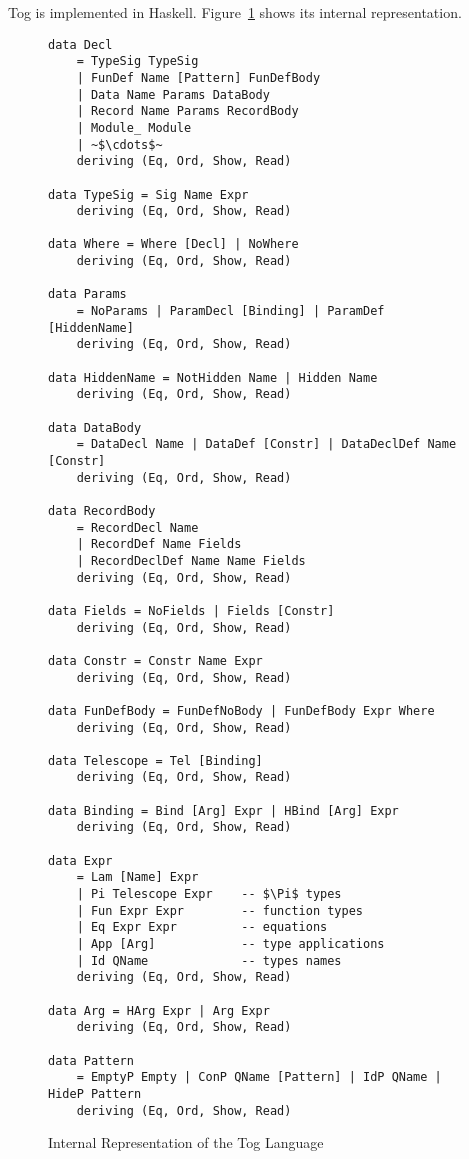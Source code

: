 Tog is implemented in Haskell. Figure~\ref{fig:togRepr} shows its internal representation. 
\begin{figure}
\begin{verbatim}
data Decl
    = TypeSig TypeSig
    | FunDef Name [Pattern] FunDefBody
    | Data Name Params DataBody
    | Record Name Params RecordBody
    | Module_ Module
    | ~$\cdots$~
    deriving (Eq, Ord, Show, Read)

data TypeSig = Sig Name Expr
    deriving (Eq, Ord, Show, Read)

data Where = Where [Decl] | NoWhere
    deriving (Eq, Ord, Show, Read)

data Params
    = NoParams | ParamDecl [Binding] | ParamDef [HiddenName]
    deriving (Eq, Ord, Show, Read)

data HiddenName = NotHidden Name | Hidden Name
    deriving (Eq, Ord, Show, Read)

data DataBody
    = DataDecl Name | DataDef [Constr] | DataDeclDef Name [Constr]
    deriving (Eq, Ord, Show, Read)

data RecordBody
    = RecordDecl Name
    | RecordDef Name Fields
    | RecordDeclDef Name Name Fields
    deriving (Eq, Ord, Show, Read)

data Fields = NoFields | Fields [Constr]
    deriving (Eq, Ord, Show, Read)

data Constr = Constr Name Expr
    deriving (Eq, Ord, Show, Read)

data FunDefBody = FunDefNoBody | FunDefBody Expr Where
    deriving (Eq, Ord, Show, Read)

data Telescope = Tel [Binding]
    deriving (Eq, Ord, Show, Read)

data Binding = Bind [Arg] Expr | HBind [Arg] Expr
    deriving (Eq, Ord, Show, Read)

data Expr
    = Lam [Name] Expr
    | Pi Telescope Expr    -- $\Pi$ types 
    | Fun Expr Expr        -- function types  
    | Eq Expr Expr         -- equations 
    | App [Arg]            -- type applications 
    | Id QName             -- types names
    deriving (Eq, Ord, Show, Read)

data Arg = HArg Expr | Arg Expr
    deriving (Eq, Ord, Show, Read)

data Pattern
    = EmptyP Empty | ConP QName [Pattern] | IdP QName | HideP Pattern
    deriving (Eq, Ord, Show, Read)
\end{verbatim}
\caption{Internal Representation of the Tog Language}
\label{fig:togRepr}
\end{figure}

